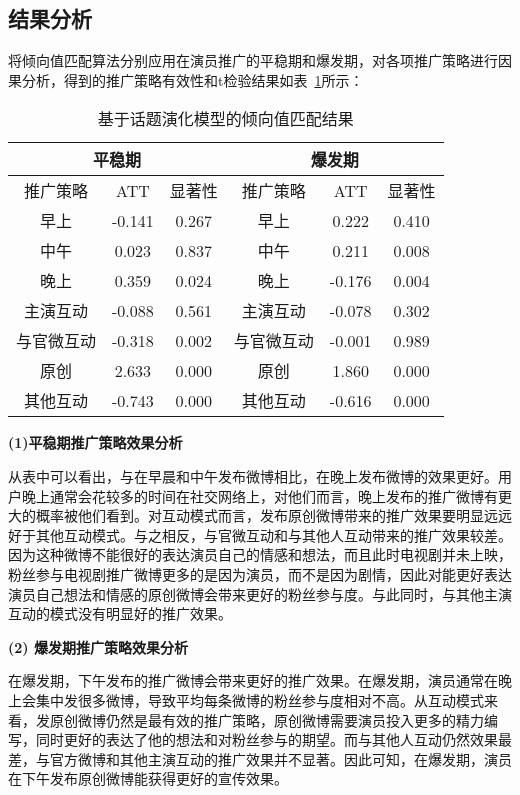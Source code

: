 \subsection{结果分析}

将倾向值匹配算法分别应用在演员推广的平稳期和爆发期，对各项推广策略进行因果分析，得到的推广策略有效性和t检验结果如表~\ref{res1}所示：

\begin{table}[!htbp]
\centering
\caption{基于话题演化模型的倾向值匹配结果}
\label{res1}
\begin{tabular}{|c|c|c|c|c|c|} \hline
\multicolumn{3}{|c|}{平稳期}& \multicolumn{3}{c|}{爆发期}\\ \hline
推广策略 & ATT & 显著性& 推广策略 & ATT & 显著性\\ \hline
早上 & -0.141 & 0.267& 早上 & 0.222 & 0.410\\%
中午 & 0.023 & 0.837 & 中午 & 0.211 & 0.008\\%
晚上 & 0.359 & 0.024 & 晚上 & -0.176 & 0.004\\ \hline
主演互动 & -0.088 & 0.561 &  主演互动 & -0.078 & 0.302\\
与官微互动& -0.318 & 0.002 & 与官微互动 & -0.001 & 0.989\\%
原创& 2.633 & 0.000 & 原创& 1.860 & 0.000\\
其他互动& -0.743 & 0.000 & 其他互动 & -0.616 & 0.000\\ \hline
\end{tabular}
\end{table}

\textbf{(1)平稳期推广策略效果分析}

从表中可以看出，与在早晨和中午发布微博相比，在晚上发布微博的效果更好。用户晚上通常会花较多的时间在社交网络上，对他们而言，晚上发布的推广微博有更大的概率被他们看到。对互动模式而言，发布原创微博带来的推广效果要明显远远好于其他互动模式。与之相反，与官微互动和与其他人互动带来的推广效果较差。因为这种微博不能很好的表达演员自己的情感和想法，而且此时电视剧并未上映，粉丝参与电视剧推广微博更多的是因为演员，而不是因为剧情，因此对能更好表达演员自己想法和情感的原创微博会带来更好的粉丝参与度。与此同时，与其他主演互动的模式没有明显好的推广效果。

\textbf{(2) 爆发期推广策略效果分析}

在爆发期，下午发布的推广微博会带来更好的推广效果。在爆发期，演员通常在晚上会集中发很多微博，导致平均每条微博的粉丝参与度相对不高。从互动模式来看，发原创微博仍然是最有效的推广策略，原创微博需要演员投入更多的精力编写，同时更好的表达了他的想法和对粉丝参与的期望。而与其他人互动仍然效果最差，与官方微博和其他主演互动的推广效果并不显著。因此可知，在爆发期，演员在下午发布原创微博能获得更好的宣传效果。

